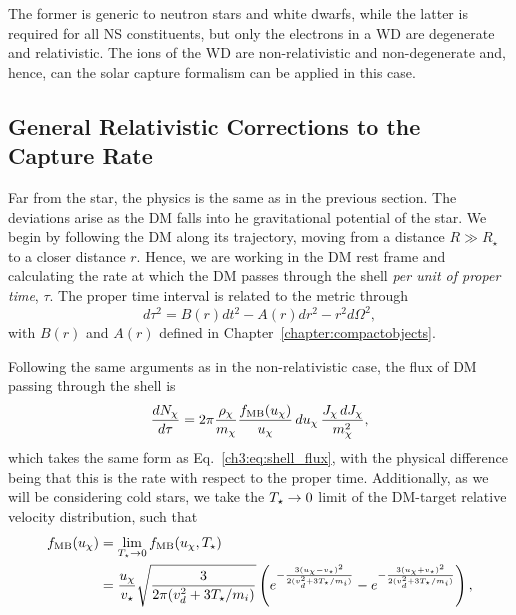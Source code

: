 The former is generic to neutron stars and white dwarfs, while the latter is required for all NS constituents, but only the electrons in a WD are degenerate and relativistic. The ions of the WD are non-relativistic and non-degenerate and, hence, can the solar capture formalism can be applied in this case. 

\subsection{General Relativistic Corrections to the Capture Rate}
\label{ch3:subsec:GR_corr_capture}

Far from the star, the physics is the same as in the previous section. The deviations arise as the DM falls into he gravitational potential of the star. We begin by following the DM along its trajectory, moving from a distance $R\gg R_\star$ to a closer distance $r$. Hence, we are working in the DM rest frame and calculating the rate at which the DM passes through the shell \textit{per unit of proper time}, $\tau$. The proper time interval is related to the metric through
\begin{equation}
    d\tau^2 = B(r) dt^2 - A(r) dr^2 - r^2 d\Omega^2,
\end{equation}
with $B(r)$ and $A(r)$ defined in Chapter~\ref{chapter:compactobjects}. 

Following the same arguments as in the non-relativistic case, the flux of DM passing through the shell is 
\begin{equation}
    \frac{d N_\chi}{d\tau} = 2\pi \frac{\rho_\chi}{m_\chi}\frac{f_{\rm MB}(u_\chi)}{u_\chi}\,du_\chi\,\frac{J_\chi \, dJ_\chi}{m_\chi^2},
\end{equation}
which takes the same form as Eq.~\ref{ch3:eq:shell_flux}, with the physical difference being that this is the rate with respect to the proper time. Additionally, as we will be considering cold stars, we take the $T_\star\rightarrow 0$ limit of the DM-target relative velocity distribution, such that 
\begin{align}
    f_{\mathrm{MB}}(u_\chi) & = \lim_{T_\star\rightarrow 0}f_{\mathrm{MB}}(u_\chi, T_\star)\\
    & = \frac{u_\chi}{v_\star} \sqrt{\frac{3 }{2 \pi (v_d^2 + 3 T_\star /m_i)}} \left( e^{-\frac{3(u_\chi - v_\star)^2}{2(v_d^2 + 3 T_\star /m_i)}} - e^{-\frac{3(u_\chi + v_\star)^2}{2(v_d^2 + 3 T_\star /m_i)}} \right),
    \label{ch3:eq:MB}
\end{align}

